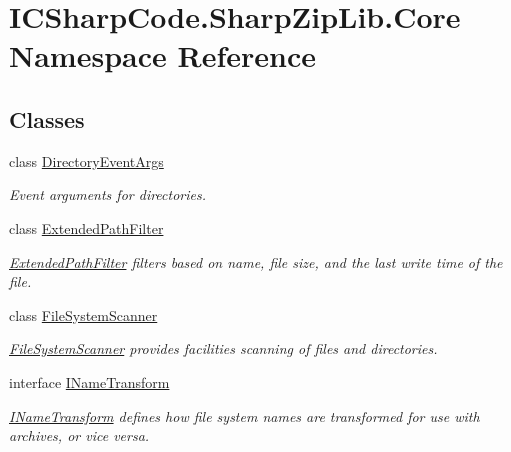 \hypertarget{namespace_i_c_sharp_code_1_1_sharp_zip_lib_1_1_core}{}\section{I\+C\+Sharp\+Code.\+Sharp\+Zip\+Lib.\+Core Namespace Reference}
\label{namespace_i_c_sharp_code_1_1_sharp_zip_lib_1_1_core}
\subsection*{Classes}
\begin{DoxyCompactItemize}
\item 
class \hyperlink{class_i_c_sharp_code_1_1_sharp_zip_lib_1_1_core_1_1_directory_event_args}{Directory\+Event\+Args}
\begin{DoxyCompactList}\small\item\em Event arguments for directories. \end{DoxyCompactList}\item 
class \hyperlink{class_i_c_sharp_code_1_1_sharp_zip_lib_1_1_core_1_1_extended_path_filter}{Extended\+Path\+Filter}
\begin{DoxyCompactList}\small\item\em \hyperlink{class_i_c_sharp_code_1_1_sharp_zip_lib_1_1_core_1_1_extended_path_filter}{Extended\+Path\+Filter} filters based on name, file size, and the last write time of the file. \end{DoxyCompactList}\item 
class \hyperlink{class_i_c_sharp_code_1_1_sharp_zip_lib_1_1_core_1_1_file_system_scanner}{File\+System\+Scanner}
\begin{DoxyCompactList}\small\item\em \hyperlink{class_i_c_sharp_code_1_1_sharp_zip_lib_1_1_core_1_1_file_system_scanner}{File\+System\+Scanner} provides facilities scanning of files and directories. \end{DoxyCompactList}\item 
interface \hyperlink{interface_i_c_sharp_code_1_1_sharp_zip_lib_1_1_core_1_1_i_name_transform}{I\+Name\+Transform}
\begin{DoxyCompactList}\small\item\em \hyperlink{interface_i_c_sharp_code_1_1_sharp_zip_lib_1_1_core_1_1_i_name_transform}{I\+Name\+Transform} defines how file system names are transformed for use with archives, or vice versa. \end{DoxyCompactList}\item 

\end{DoxyCompactItemize}
